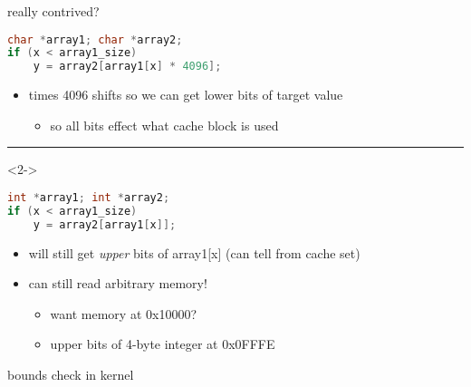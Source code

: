 \begin{frame}[fragile]{really contrived?}
\begin{lstlisting}[language=C,style=smaller]
char *array1; char *array2;
if (x < array1_size)
    y = array2[array1[x] * 4096];
\end{lstlisting}
\begin{itemize}
\item times 4096 shifts so we can get lower bits of target value
    \begin{itemize}
    \item so all bits effect what cache block is used
    \end{itemize}
\end{itemize}
\hrule
\begin{visibleenv}<2->
\begin{lstlisting}[language=C,style=smaller]
int *array1; int *array2;
if (x < array1_size)
    y = array2[array1[x]];
\end{lstlisting}
\begin{itemize}
\item will still get \textit{upper} bits of array1[x] (can tell from cache set)
\item<2-> can still read arbitrary memory!
    \begin{itemize}
    \item want memory at 0x10000?
    \item upper bits of 4-byte integer at 0x0FFFE
    \end{itemize}
\end{itemize}
\end{visibleenv}
\end{frame}

\begin{frame}[fragile]{bounds check in kernel}
\end{frame}
